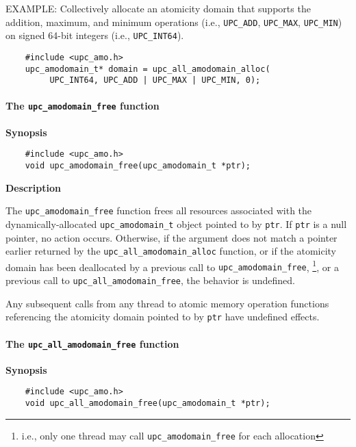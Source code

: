 \np EXAMPLE: Collectively allocate an atomicity domain that supports the
    addition, maximum, and minimum operations (i.e., {\tt UPC\_ADD},
    {\tt UPC\_MAX}, {\tt UPC\_MIN}) on signed 64-bit integers (i.e.,
    {\tt UPC\_INT64}).
\begin{verbatim}
    #include <upc_amo.h>
    upc_amodomain_t* domain = upc_all_amodomain_alloc(
         UPC_INT64, UPC_ADD | UPC_MAX | UPC_MIN, 0);
\end{verbatim}

\paragraph{The {\tt upc\_amodomain\_free} function}

{\bf Synopsis}

\npf\vspace{-1.8em}
\begin{verbatim}
    #include <upc_amo.h>
    void upc_amodomain_free(upc_amodomain_t *ptr);
\end{verbatim}

{\bf Description}

\np The {\tt upc\_amodomain\_free} function frees all resources associated with
    the dynamically-allocated {\tt upc\_amodomain\_t} object pointed to by
    {\tt ptr}.  If {\tt ptr} is a null pointer, no action occurs.  Otherwise,
    if the argument does not match a pointer earlier returned by the
    {\tt upc\_all\_amodomain\_alloc} function, or if the atomicity domain has
    been deallocated by a previous call to {\tt upc\_amodomain\_free},%
    \footnote{i.e., only one thread may call {\tt upc\_amodomain\_free} for
    each allocation}, or a previous call to {\tt upc\_all\_amodomain\_free},
    the behavior is undefined.

\np Any subsequent calls from any thread to atomic memory operation functions
    referencing the atomicity domain pointed to by {\tt ptr} have undefined
    effects.

\paragraph{The {\tt upc\_all\_amodomain\_free} function}

{\bf Synopsis}

\npf\vspace{-1.8em}
\begin{verbatim}
    #include <upc_amo.h>
    void upc_all_amodomain_free(upc_amodomain_t *ptr);
\end{verbatim}

